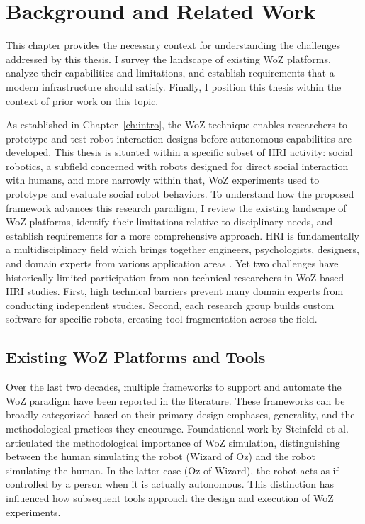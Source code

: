 \chapter{Background and Related Work}
\label{ch:background}

This chapter provides the necessary context for understanding the challenges addressed by this thesis. I survey the landscape of existing WoZ platforms, analyze their capabilities and limitations, and establish requirements that a modern infrastructure should satisfy. Finally, I position this thesis within the context of prior work on this topic.

As established in Chapter~\ref{ch:intro}, the WoZ technique enables researchers to prototype and test robot interaction designs before autonomous capabilities are developed. This thesis is situated within a specific subset of HRI activity: social robotics, a subfield concerned with robots designed for direct social interaction with humans, and more narrowly within that, WoZ experiments used to prototype and evaluate social robot behaviors. To understand how the proposed framework advances this research paradigm, I review the existing landscape of WoZ platforms, identify their limitations relative to disciplinary needs, and establish requirements for a more comprehensive approach. HRI is fundamentally a multidisciplinary field which brings together engineers, psychologists, designers, and domain experts from various application areas \cite{Bartneck2024}. Yet two challenges have historically limited participation from non-technical researchers in WoZ-based HRI studies. First, high technical barriers prevent many domain experts from conducting independent studies. Second, each research group builds custom software for specific robots, creating tool fragmentation across the field.

\section{Existing WoZ Platforms and Tools}

Over the last two decades, multiple frameworks to support and automate the WoZ paradigm have been reported in the literature. These frameworks can be broadly categorized based on their primary design emphases, generality, and the methodological practices they encourage. Foundational work by Steinfeld et al. \cite{Steinfeld2009} articulated the methodological importance of WoZ simulation, distinguishing between the human simulating the robot (Wizard of Oz) and the robot simulating the human. In the latter case (Oz of Wizard), the robot acts as if controlled by a person when it is actually autonomous. This distinction has influenced how subsequent tools approach the design and execution of WoZ experiments.

